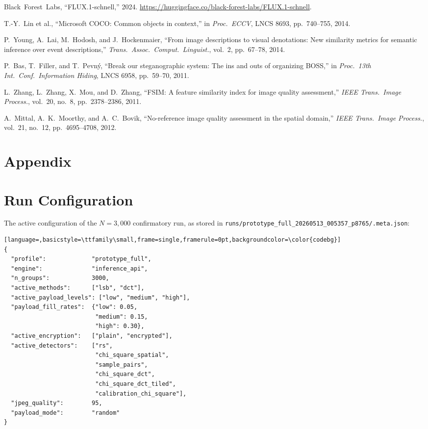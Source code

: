 \documentclass[10pt,twocolumn,a4paper]{article}
\renewcommand{\thesection}{\Roman{section}}
\begin{document}
\begin{thebibliography}{30}
Black~Forest~Labs,
``FLUX.1-schnell,''
2024.
\url{https://huggingface.co/black-forest-labs/FLUX.1-schnell}.

T.-Y.~Lin et al.,
``Microsoft COCO: Common objects in context,''
in \textit{Proc.\ ECCV}, LNCS 8693, pp.~740--755, 2014.

P.~Young, A.~Lai, M.~Hodosh, and J.~Hockenmaier,
``From image descriptions to visual denotations: New similarity metrics for semantic inference over event descriptions,''
\textit{Trans.\ Assoc.\ Comput.\ Linguist.}, vol.~2, pp.~67--78, 2014.

P.~Bas, T.~Filler, and T.~Pevn\'{y},
``Break our steganographic system: The ins and outs of organizing BOSS,''
in \textit{Proc.\ 13th Int.\ Conf.\ Information Hiding}, LNCS 6958, pp.~59--70, 2011.

L.~Zhang, L.~Zhang, X.~Mou, and D.~Zhang,
``FSIM: A feature similarity index for image quality assessment,''
\textit{IEEE Trans.\ Image Process.}, vol.~20, no.~8, pp.~2378--2386, 2011.

A.~Mittal, A.~K.~Moorthy, and A.~C.~Bovik,
``No-reference image quality assessment in the spatial domain,''
\textit{IEEE Trans.\ Image Process.}, vol.~21, no.~12, pp.~4695--4708, 2012.

\end{thebibliography}

\onecolumn
\appendix
\section*{Appendix}
\renewcommand{\thesection}{\Alph{section}}
\setcounter{section}{0}

\section{Run Configuration}
\label{app:config}
The active configuration of the $N\!=\!3{,}000$ confirmatory run, as stored in \texttt{runs/prototype\_full\_20260513\_005357\_p8765/.meta.json}:
\begin{lstlisting}[language=,basicstyle=\ttfamily\small,frame=single,framerule=0pt,backgroundcolor=\color{codebg}]
{
  "profile":             "prototype_full",
  "engine":              "inference_api",
  "n_groups":            3000,
  "active_methods":      ["lsb", "dct"],
  "active_payload_levels": ["low", "medium", "high"],
  "payload_fill_rates":  {"low": 0.05,
                          "medium": 0.15,
                          "high": 0.30},
  "active_encryption":   ["plain", "encrypted"],
  "active_detectors":    ["rs",
                          "chi_square_spatial",
                          "sample_pairs",
                          "chi_square_dct",
                          "chi_square_dct_tiled",
                          "calibration_chi_square"],
  "jpeg_quality":        95,
  "payload_mode":        "random"
}
\end{lstlisting}
\end{document}
